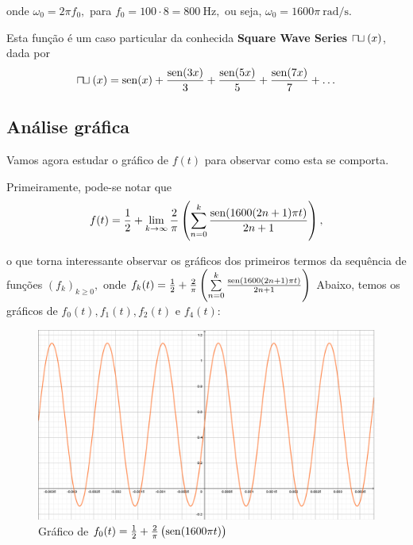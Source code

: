 \documentclass[11pt,twoside,a4paper]{book}
\begin{document}
onde $\omega_0 = 2 \pi f_0,$ para $f_0 = 100 \cdot 8 = 800 \ \mbox{Hz},$ ou seja, $\omega_0 = 1600 \pi \ \mbox{rad/s}.$

Esta função é um caso particular da conhecida \textbf{Square Wave Series} $\sqcap\ \hspace{-7pt}\sqcup (x)$, dada por
\[
\sqcap\ \hspace{-7pt}\sqcup (x) = \sen(x) + \frac{\sen(3x)}{3} + \frac{\sen(5x)}{5} + \frac{\sen(7x)}{7} + \ldots
\]


\subsection{Análise gráfica}

Vamos agora estudar o gráfico de $f(t)$ para observar como esta se comporta.

Primeiramente, pode-se notar que 
\[f(t) = \frac{1}{2} + \lim\limits_{k \to \infty} \frac{2}{\pi} \left( \sum\limits_{n = 0}^{k} \frac{{\rm sen}(1600(2n+1) \pi t)}{2n+1} \right),
\]

o que torna interessante observar os gráficos dos primeiros termos da sequência de funções $(f_k)_{k \ge 0},$ onde $f_k(t) = \frac{1}{2} + \frac{2}{\pi} \left( \sum\limits_{n = 0}^{k} \frac{{\rm sen}(1600(2n+1) \pi t)}{2n+1} \right)$
Abaixo, temos os gráficos de $f_0(t), f_1(t), f_2(t)$ e $f_4(t):$


\begin{figure}[h]
    \centering
    \includegraphics[width=.950\textwidth]{figuras/grafiof0malha.png}
    \caption{Gráfico de $f_0(t) = \frac{1}{2} + \frac{2}{\pi} \left( {\rm sen}( 1600 \pi t)  \right)  $}
    \label{fig:1}
\end{figure}
\end{document}
